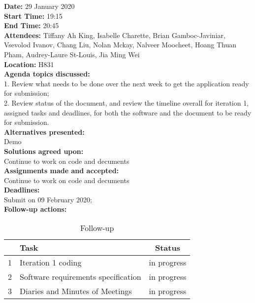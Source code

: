 \documentclass[12pt]{article}
\begin{document}
\newpage
{\bf Date:} 29 January 2020\\
{\bf Start Time:} 19:15\\
{\bf End Time:}  20:45\\
{\bf Attendees:} Tiffany Ah King,
Isabelle Charette,
Brian Gamboc-Javiniar,
Vsevolod Ivanov,
Chang Liu,
Nolan Mckay,
Nalveer Moocheet,
Hoang Thuan Pham,
Audrey-Laure St-Louis,
Jia Ming Wei\\
{\bf Location:} H831 \\
{\bf Agenda topics discussed:} \\1. Review what needs to be done over the next week to get the application ready for submission; \\2. Review status of the document, and review the timeline overall for iteration 1, assigned tasks and deadlines, for both the software and the document to be ready for submission.\\
{\bf Alternatives presented:} \\Demo \\
{\bf Solutions agreed upon:} \\ Continue to work on code and decuments\\
{\bf Assignments made and accepted:} \\  Continue to work on code and decuments\\
{\bf Deadlines:} \\Submit on 09 February 2020; \\
{\bf Follow-up actions:} \\
\begin{table}[h!]
\centering
 \begin{tabular}{||l l c ||} 
 \hline
   & Task & Status\\ [0.5ex] 
 \hline\hline
 1 & Iteration 1 coding & in progress \\ 
 2 & Software requirements specification &  in progress\\
 3 & Diaries and Minutes of Meetings &  in progress\\[1ex] 

 \hline
 \end{tabular}
\caption{Follow-up }
\label{table:1}
\end{table}
\end{document}
